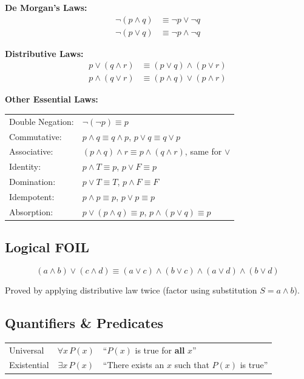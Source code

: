 \documentclass{article}
\begin{document}
\textbf{De Morgan's Laws:}
\begin{align*}
    \neg(p \land q) &\equiv \neg p \lor \neg q \\
    \neg(p \lor q) &\equiv \neg p \land \neg q
\end{align*}

\textbf{Distributive Laws:}
\begin{align*}
    p \lor (q \land r) &\equiv (p \lor q) \land (p \lor r) \\
    p \land (q \lor r) &\equiv (p \land q) \lor (p \land r)
\end{align*}

\textbf{Other Essential Laws:}

\begin{tabular}{ll}
Double Negation: & $\neg(\neg p) \equiv p$ \\
Commutative: & $p \land q \equiv q \land p$, \quad $p \lor q \equiv q \lor p$ \\
Associative: & $(p \land q) \land r \equiv p \land (q \land r)$, \quad same for $\lor$ \\
Identity: & $p \land T \equiv p$, \quad $p \lor F \equiv p$ \\
Domination: & $p \lor T \equiv T$, \quad $p \land F \equiv F$ \\
Idempotent: & $p \land p \equiv p$, \quad $p \lor p \equiv p$ \\
Absorption: & $p \lor (p \land q) \equiv p$, \quad $p \land (p \lor q) \equiv p$
\end{tabular}

\subsection*{Logical FOIL}

\[(a \land b) \lor (c \land d) \equiv (a \lor c) \land (b \lor c) \land (a \lor d) \land (b \lor d)\]

Proved by applying distributive law twice (factor using substitution $S = a \land b$).

\subsection*{Quantifiers \& Predicates}

\begin{tabular}{lcl}
Universal & $\forall x\, P(x)$ & ``$P(x)$ is true for \textbf{all} $x$'' \\
Existential & $\exists x\, P(x)$ & ``There exists an $x$ such that $P(x)$ is true''
\end{tabular}
\end{document}
